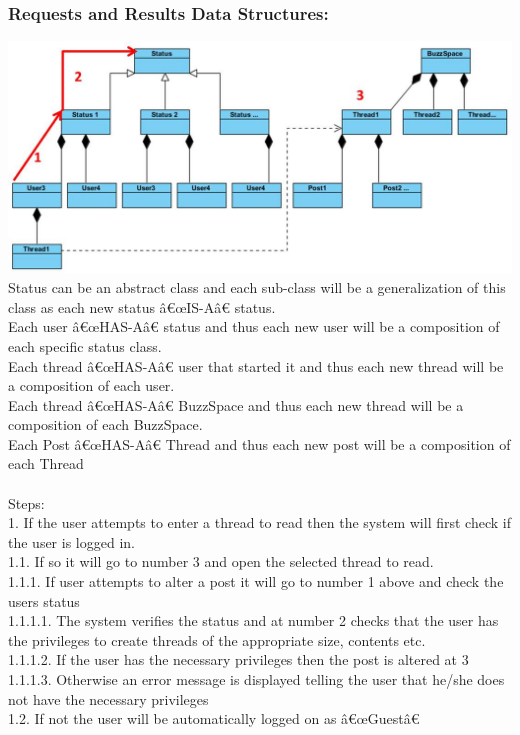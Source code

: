 \documentclass[a4paper,11pt]{article}
\begin{document}
\subsubsection*{Requests and Results Data Structures:}
\includegraphics[width=1\linewidth]{./Images/CRUDThread/Diagrams/5.jpg}\\
Status can be an abstract class and each sub-class will be a generalization of this class as each new status â€œIS-Aâ€ status.\\
Each user â€œHAS-Aâ€ status and thus each new user will be a composition of each specific status class.\\
Each thread â€œHAS-Aâ€ user that started it and thus each new thread will be a composition of each user.\\
Each thread â€œHAS-Aâ€ BuzzSpace and thus each new thread will be a composition of each BuzzSpace.\\
Each Post â€œHAS-Aâ€ Thread and thus each new post will be a composition of each Thread\\\\

Steps:\\
1.	If the user attempts to enter a thread to read then the system will first check if the user is logged in.\\
1.1.	If so it will go to number 3 and open the selected thread to read.\\
1.1.1.	If user attempts to alter a post it will go to number 1 above and check the users status\\
1.1.1.1.	The system verifies the status and at number 2 checks that the user has the privileges to create threads of the appropriate size, contents etc.\\
1.1.1.2.	If the user has the necessary privileges then the post is altered at 3\\
1.1.1.3.	Otherwise an error message is displayed telling the user that he/she does not have the necessary privileges \\
1.2.	If not the user will be automatically logged on as â€œGuestâ€
\end{document}
